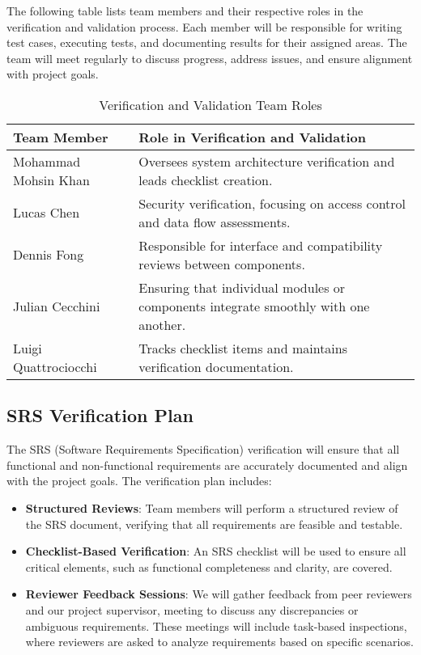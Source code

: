 \documentclass[12pt, titlepage]{article}
\begin{document}
The following table lists team members and their respective roles in the verification and validation process. Each member will be responsible for writing test cases, executing tests, and documenting results for their assigned areas. The team will meet regularly to discuss progress, address issues, and ensure alignment with project goals.

\begin{table}[h!]
  \centering
  \begin{tabular}{|p{5cm}|p{10cm}|}
      \hline
      \textbf{Team Member} & \textbf{Role in Verification and Validation} \\
      \hline
      Mohammad Mohsin Khan & Oversees system architecture verification and leads checklist creation. \\
      \hline
      Lucas Chen & Security verification, focusing on access control and data flow assessments. \\
      \hline
      Dennis Fong & Responsible for interface and compatibility reviews between components. \\
      \hline
      Julian Cecchini & Ensuring that individual modules or components integrate smoothly with one another. \\
      \hline
      Luigi Quattrociocchi & Tracks checklist items and maintains verification documentation. \\
      \hline
  \end{tabular}
  \caption{Verification and Validation Team Roles}
  \label{tab:team-roles}
\end{table}


\subsection{SRS Verification Plan}

The SRS (Software Requirements Specification) verification will ensure that all functional and non-functional requirements are accurately documented and align with the project goals. The verification plan includes:

\begin{itemize}
    \item \textbf{Structured Reviews}: Team members will perform a structured review of the SRS document, verifying that all requirements are feasible and testable.
    \item \textbf{Checklist-Based Verification}: An SRS checklist will be used to ensure all critical elements, such as functional completeness and clarity, are covered.
    \item \textbf{Reviewer Feedback Sessions}: We will gather feedback from peer reviewers and our project supervisor, meeting to discuss any discrepancies or ambiguous requirements. These meetings will include task-based inspections, where reviewers are asked to analyze requirements based on specific scenarios.
\end{itemize}
\end{document}
